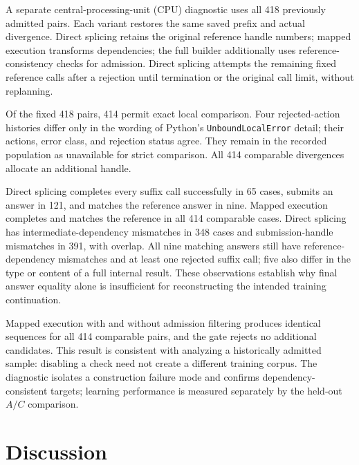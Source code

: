 \begin{table}[htbp]
 \centering
 \caption{Offline suffix construction on 414 strictly comparable historical training pairs. Four further pairs remain explicitly unavailable for exact replay within the fixed population of 418.}
 \label{tab:construction-en}
 \RecoveryConstructionTableEN
\end{table}

A separate central-processing-unit (CPU) diagnostic uses all 418 previously admitted pairs. Each variant restores the same saved prefix and actual divergence. Direct splicing retains the original reference handle numbers; mapped execution transforms dependencies; the full builder additionally uses reference-consistency checks for admission. Direct splicing attempts the remaining fixed reference calls after a rejection until termination or the original call limit, without replanning.

Of the fixed 418 pairs, 414 permit exact local comparison. Four rejected-action histories differ only in the wording of Python's \texttt{UnboundLocalError} detail; their actions, error class, and rejection status agree. They remain in the recorded population as unavailable for strict comparison. All 414 comparable divergences allocate an additional handle.

Direct splicing completes every suffix call successfully in 65 cases, submits an answer in 121, and matches the reference answer in nine. Mapped execution completes and matches the reference in all 414 comparable cases. Direct splicing has intermediate-dependency mismatches in 348 cases and submission-handle mismatches in 391, with overlap. All nine matching answers still have reference-dependency mismatches and at least one rejected suffix call; five also differ in the type or content of a full internal result. These observations establish why final answer equality alone is insufficient for reconstructing the intended training continuation.

Mapped execution with and without admission filtering produces identical sequences for all 414 comparable pairs, and the gate rejects no additional candidates. This result is consistent with analyzing a historically admitted sample: disabling a check need not create a different training corpus. The diagnostic isolates a construction failure mode and confirms dependency-consistent targets; learning performance is measured separately by the held-out $A/C$ comparison.

\section{Discussion}

